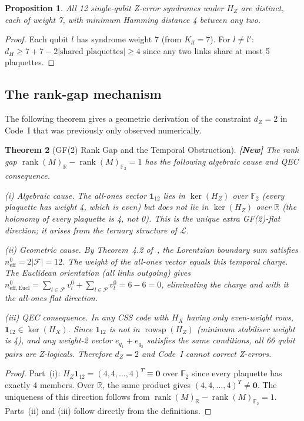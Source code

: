 \documentclass[12pt,a4paper]{article}
\theoremstyle{plain}
\newtheorem{theorem}{Theorem}[section]
\newtheorem{proposition}[theorem]{Proposition}
\theoremstyle{definition}
\theoremstyle{remark}
\newcommand{\GFtwo}{\mathbb{F}_2}
\newcommand{\R}{\mathbb{R}}
\newcommand{\HZ}{H_Z}
\newcommand{\rank}{\operatorname{rank}}
\newcommand{\rowsp}{\operatorname{rowsp}}
\newcommand{\Lat}{\mathscr{L}}
\newcommand{\FS}{\mathcal{F}}
\newcommand{\PS}{\mathcal{P}}
\newcommand{\NEW}{\textcolor{newcolor}{\textbf{[New]}}}
\begin{document}
\begin{proposition}\label{prop:syndrome}
All 12 single-qubit Z-error syndromes under $\HZ$ are distinct,
each of weight 7, with minimum Hamming distance 4 between any two.
\end{proposition}
\begin{proof}
Each qubit $l$ has syndrome weight 7 (from $K_{ll}=7$).
For $l \neq l'$: $d_H \geq 7+7-2|\text{shared plaquettes}| \geq 4$
since any two links share at most 5 plaquettes.
\end{proof}

\subsection{The rank-gap mechanism}\label{sec:rankgap}

The following theorem gives a geometric derivation of the constraint
$d_Z = 2$ in Code~I that was previously only observed numerically.

\begin{theorem}[GF(2) Rank Gap and the Temporal Obstruction]
\label{thm:rankgap}
\NEW\; The rank gap $\rank(M)_\R - \rank(M)_{\GFtwo} = 1$ has the
following algebraic cause and QEC consequence.

\emph{(i) Algebraic cause.}
The all-ones vector $\bm{1}_{12}$ lies in $\ker(\HZ)$ over $\GFtwo$
(every plaquette has weight 4, which is even) but does \emph{not} lie
in $\ker(\HZ)$ over $\R$ (the holonomy of every plaquette is 4, not 0).
This is the unique extra GF(2)-flat direction; it arises from the
ternary structure of $\Lat$.

\emph{(ii) Geometric cause.}
By Theorem~4.2 of~\cite{SchmittCD}, the Lorentzian boundary sum satisfies
$n_{\mathrm{eff}}^0 = 2|\FS| = 12$.
The weight of the all-ones vector equals this temporal charge.
The Euclidean orientation (all links outgoing) gives
$n_{\mathrm{eff},\mathrm{Eucl}}^0 = \sum_{l\in\FS} v_l^0 + \sum_{l\in\PS} v_l^0 = 6-6 = 0$,
eliminating the charge and with it the all-ones flat direction.

\emph{(iii) QEC consequence.}
In any CSS code with $H_X$ having only even-weight rows,
$\bm{1}_{12} \in \ker(H_X)$.
Since $\bm{1}_{12}$ is not in $\rowsp(\HZ)$ (minimum stabiliser weight
is 4), and any weight-2 vector $e_{q_1}+e_{q_2}$ satisfies the same
conditions, all 66 qubit pairs are Z-logicals.
Therefore $d_Z = 2$ and Code~I cannot correct Z-errors.
\end{theorem}
\begin{proof}
Part~(i): $\HZ \bm{1}_{12} = (4,4,\ldots,4)^T \equiv \bm{0}$ over $\GFtwo$
since every plaquette has exactly 4 members.
Over $\R$, the same product gives $(4,4,\ldots,4)^T \neq \bm{0}$.
The uniqueness of this direction follows from $\rank(M)_\R - \rank(M)_{\GFtwo} = 1$.
Parts~(ii) and (iii) follow directly from the definitions.
\end{proof}
\end{document}
